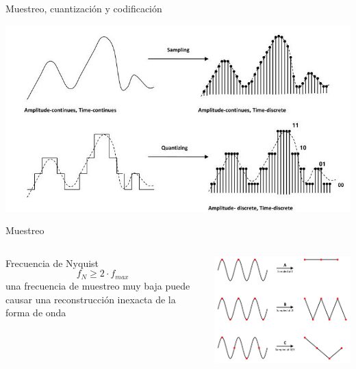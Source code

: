 \documentclass[aspectratio=169]{beamer}
\begin{document}
\begin{frame}{Muestreo, cuantización y codificación}
\begin{center}
    \includegraphics[width=0.9\linewidth]{presentaciones/fig/muestreo.jpg}
\end{center}
\end{frame}

\begin{frame}{Muestreo}
    \begin{columns}
    \begin{column}{0.4\textwidth}
        \centering
        Frecuencia de Nyquist
        \begin{equation*}
            f_N \geq 2\cdot f_{max} 
        \end{equation*}
        una frecuencia de muestreo muy baja puede causar una reconstrucción inexacta de la forma de onda
    \end{column}
    \begin{column}{0.6\textwidth}
        \begin{center}
            \includegraphics[width=0.9\linewidth]{presentaciones/fig/sampling.png}  
        \end{center}
    \end{column}
    \end{columns}
\end{frame}
\end{document}
